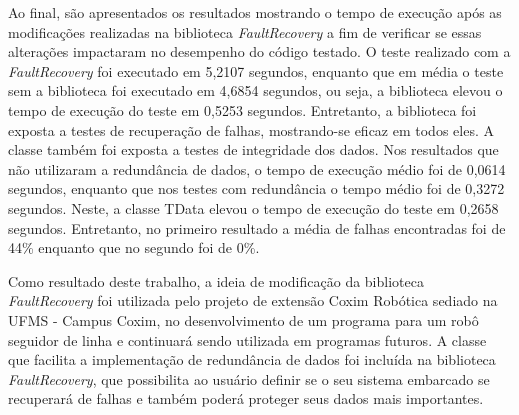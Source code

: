 Ao final, são apresentados os resultados mostrando o tempo de execução após as modificações realizadas na biblioteca \textit{FaultRecovery} a fim de verificar se essas alterações impactaram no desempenho do código testado. O teste realizado com a \textit{FaultRecovery} foi executado em 5,2107 segundos, enquanto que em média o teste sem a biblioteca foi executado em 4,6854 segundos, ou seja, a biblioteca elevou o tempo de execução do teste em 0,5253 segundos. Entretanto, a biblioteca foi exposta a testes de recuperação de falhas, mostrando-se eficaz em todos eles. A classe também foi exposta a testes de integridade dos dados. Nos resultados que não utilizaram a redundância de dados, o tempo de execução médio foi de 0,0614 segundos, enquanto que nos testes com redundância o tempo médio foi de 0,3272 segundos. Neste, a classe TData elevou o tempo de execução do teste em 0,2658 segundos. Entretanto, no primeiro resultado a média de falhas encontradas foi de 44\% enquanto que no segundo foi de 0\%.

Como resultado deste trabalho, a ideia de modificação da biblioteca \textit{FaultRecovery} foi utilizada pelo projeto de extensão Coxim Robótica sediado na UFMS - Campus Coxim, no desenvolvimento de um programa para um robô seguidor de linha e continuará sendo utilizada em programas futuros. A classe que facilita a implementação de redundância de dados foi incluída na biblioteca \textit{FaultRecovery}, que possibilita ao usuário definir se o seu sistema embarcado se recuperará de falhas e também poderá proteger seus dados mais importantes.
